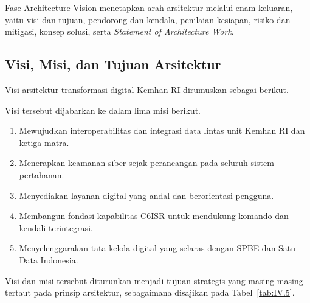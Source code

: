 Fase Architecture Vision menetapkan arah arsitektur melalui enam keluaran, yaitu visi dan tujuan, pendorong dan kendala, penilaian kesiapan, risiko dan mitigasi, konsep solusi, serta \textit{Statement of Architecture Work}.

\subsection{Visi, Misi, dan Tujuan Arsitektur}
\label{sec:IV.2.1}

Visi arsitektur transformasi digital Kemhan RI dirumuskan sebagai berikut.

\begin{center}
\end{center}

Visi tersebut dijabarkan ke dalam lima misi berikut.
\begin{enumerate}[label=\arabic*.]
\item Mewujudkan interoperabilitas dan integrasi data lintas unit Kemhan RI dan ketiga matra.
\item Menerapkan keamanan siber sejak perancangan pada seluruh sistem pertahanan.
\item Menyediakan layanan digital yang andal dan berorientasi pengguna.
\item Membangun fondasi kapabilitas C6ISR untuk mendukung komando dan kendali terintegrasi.
\item Menyelenggarakan tata kelola digital yang selaras dengan SPBE dan Satu Data Indonesia.
\end{enumerate}

Visi dan misi tersebut diturunkan menjadi tujuan strategis yang masing-masing tertaut pada prinsip arsitektur, sebagaimana disajikan pada Tabel~\ref{tab:IV.5}.


